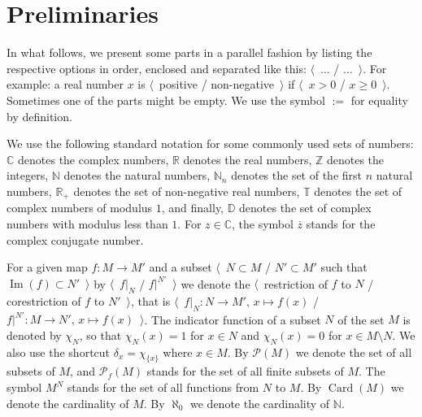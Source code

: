 
\chapter{Preliminaries}\label{ChapterPreliminaries} 


In what follows, we present some parts in a parallel fashion by listing the
respective options in order, enclosed and separated like this:
$\langle$~$\ldots$ / $\ldots$~$\rangle$. For example: a real number $x$ is
$\langle$~positive / non-negative~$\rangle$ if $\langle$~$x>0$ / $x\geq
0$~$\rangle$. Sometimes one of the parts might be empty. We use the symbol $:=$ for
equality by definition.

We use the following standard notation for some commonly used sets of numbers:
$\mathbb{C}$ denotes the complex numbers, $\mathbb{R}$ denotes the real numbers,
$\mathbb{Z}$ denotes the integers, $\mathbb{N}$ denotes the natural numbers,
$\mathbb{N}_n$ denotes the set of the first $n$ natural numbers, $\mathbb{R}_+$
denotes the set of non-negative real numbers, $\mathbb{T}$ denotes the set of
complex numbers of modulus $1$, and finally, $\mathbb{D}$ denotes the set of complex
numbers with modulus less than $1$. For $z\in\mathbb{C}$, the symbol
$\overline{z}$ stands for the complex conjugate number.

For a given map $f:M\to M'$ and a subset $\langle$~$N\subset M$ / $N'\subset M'$
such that $\operatorname{Im}(f)\subset N'$~$\rangle$ by $\langle$~$f|_N$ /
$f|^{N'}$~$\rangle$ we denote the  $\langle$~restriction of $f$ to $N$ /
corestriction of $f$ to $N'$~$\rangle$, that is $\langle$~$f|_N:N\to
M',\,x\mapsto f(x)$ / $f|^{N'}:M\to N',\, x\mapsto f(x)$~$\rangle$. The indicator
function of a subset $N$ of the set $M$ is denoted by $\chi_{N}$, so that
$\chi_N(x)=1$ for $x\in N$ and $\chi_N(x)=0$ for $x\in M\setminus N$. We also
use the shortcut $\delta_x=\chi_{ \{x \}}$ where $x\in M$. By $\mathcal{P}(M)$
we denote the set of all subsets of $M$, and $\mathcal{P}_{f}(M)$ stands for the
set of all finite subsets of $M$. The symbol $M^N$ stands for the set of all
functions from $N$ to $M$. By $\operatorname{Card}(M)$ we denote the cardinality
of $M$. By $\aleph_0$ we denote the cardinality of $\mathbb{N}$.

